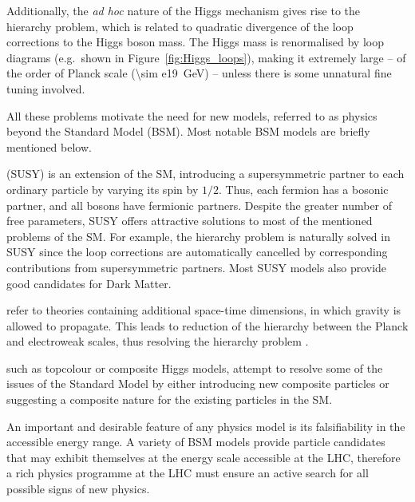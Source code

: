 Additionally, the \textit{ad hoc} nature of the Higgs mechanism gives rise to the hierarchy problem, which is related to
quadratic divergence of the loop corrections to the Higgs boson mass. The Higgs mass is renormalised by loop diagrams
(e.g.\ shown in Figure~\ref{fig:Higgs_loops}), making it extremely large  -- of the order of Planck scale (\SI{\sim
e19}{\GeV}) -- unless there is some unnatural fine tuning involved.



All these problems motivate the need for new models, referred to as physics beyond the Standard Model (BSM). Most
notable BSM models are briefly mentioned below.

\begin{description}[wide=\parindent]
\item [Supersymmetry] (SUSY) \autocite{SUSY_primer} is an extension of the SM, introducing a supersymmetric partner to
each ordinary particle by varying its spin by $1/2$. Thus, each fermion has a bosonic partner, and all bosons have
fermionic partners. Despite the greater number of free parameters, SUSY offers attractive solutions to most of the
mentioned problems of the SM. For example, the hierarchy problem is naturally solved in SUSY since the loop corrections
are automatically cancelled by corresponding contributions from supersymmetric partners. Most SUSY models also provide
good candidates for Dark Matter.
\item [Extra dimensions] refer to theories containing additional space-time dimensions, in which gravity is allowed to
propagate. This leads to reduction of the hierarchy between the Planck and electroweak scales, thus resolving the
hierarchy problem \autocite{Arkani-Hamed, RS}.
\item [Composite models,] such as topcolour \autocite{topcolour} or composite Higgs \autocite{composite_Higgs} models,
attempt to resolve some of the issues of the Standard Model by either introducing new composite particles or suggesting
a composite nature for the existing particles in the SM.
\end{description}

An important and desirable feature of any physics model is its falsifiability in the accessible energy range. A variety
of BSM models provide particle candidates that may exhibit themselves at the energy scale accessible at the LHC,
therefore a rich physics programme at the LHC must ensure an active search for all possible signs of new physics.

